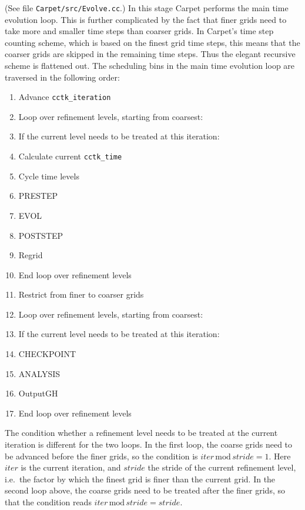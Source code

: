 \documentclass{article}
\begin{document}
   (See file \texttt{Carpet/src/Evolve.cc}.)  In this stage Carpet
   performs the main time evolution loop.  This is further complicated
   by the fact that finer grids need to take more and smaller time
   steps than coarser grids.  In Carpet's time step counting scheme,
   which is based on the finest grid time steps, this means that the
   coarser grids are skipped in the remaining time steps.  Thus the
   elegant recursive scheme is flattened out.  The scheduling bins in
   the main time evolution loop are traversed in the following order:
\begin{enumerate}
\itemsep 0pt
\item
   Advance \texttt{cctk\_iteration}
\item
   Loop over refinement levels, starting from coarsest:
\item \quad
   If the current level needs to be treated at this iteration:
\item \quad \quad
   Calculate current \texttt{cctk\_time}
\item \quad \quad
   Cycle time levels
\item \quad \quad
   PRESTEP
\item \quad \quad
   EVOL
\item \quad \quad
   POSTSTEP
\item \quad \quad
   Regrid
\item
   End loop over refinement levels
\item
   Restrict from finer to coarser grids
\item
   Loop over refinement levels, starting from coarsest:
\item \quad
   If the current level needs to be treated at this iteration:
\item \quad \quad
   CHECKPOINT
\item \quad \quad
   ANALYSIS
\item \quad \quad
   OutputGH
\item
   End loop over refinement levels
\end{enumerate}

   The condition whether a refinement level needs to be treated at the
   current iteration is different for the two loops.  In the first
   loop, the coarse grids need to be advanced before the finer grids,
   so the condition is $iter \,\mathrm{mod}\, stride = 1$.  Here
   $iter$ is the current iteration, and $stride$ the stride of the
   current refinement level, i.e.\ the factor by which the finest grid
   is finer than the current grid.  In the second loop above, the
   coarse grids need to be treated after the finer grids, so that the
   condition reads $iter \,\mathrm{mod}\, stride = stride$.
\end{document}
